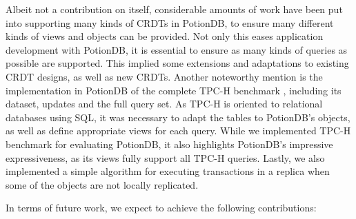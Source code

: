 Albeit not a contribution on itself, considerable amounts of work have been put into supporting many kinds of CRDTs in PotionDB, to ensure many different kinds of views and objects can be provided.
Not only this eases application development with PotionDB, it is essential to ensure as many kinds of queries as possible are supported.
This implied some extensions and adaptations to existing CRDT designs, as well as new CRDTs.
Another noteworthy mention is the implementation in PotionDB of the complete TPC-H benchmark \cite{tpch}, including its dataset, updates and the full query set. %
As TPC-H is oriented to relational databases using SQL, it was necessary to adapt the tables to PotionDB's objects, as well as define appropriate views for each query.
While we implemented TPC-H benchmark for evaluating PotionDB, it also highlights PotionDB's impressive expressiveness, as its views fully support all TPC-H queries.
Lastly, we also implemented a simple algorithm for executing transactions in a replica when some of the objects are not locally replicated. 

In terms of future work, we expect to achieve the following contributions:

